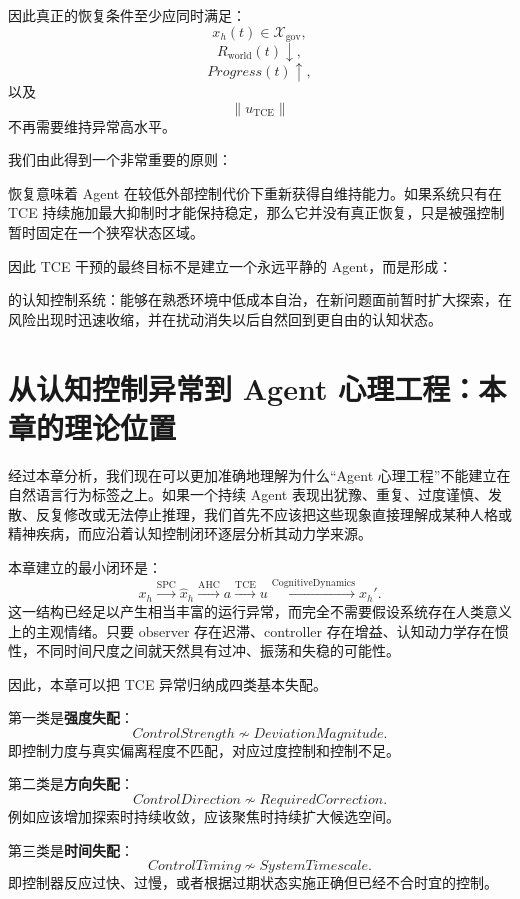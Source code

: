 因此真正的恢复条件至少应同时满足：
\[
x_h(t)\in\mathcal X_{\mathrm{gov}},
\]
\[
R_{\mathrm{world}}(t)\downarrow,
\]
\[
Progress(t)\uparrow,
\]
以及
\[
\|u_{\mathrm{TCE}}\|
\]
不再需要维持异常高水平。

我们由此得到一个非常重要的原则：
\begin{statementbox}
\centering
{}
\end{statementbox}
恢复意味着 Agent 在较低外部控制代价下重新获得自维持能力。如果系统只有在 TCE 持续施加最大抑制时才能保持稳定，那么它并没有真正恢复，只是被强控制暂时固定在一个狭窄状态区域。

因此 TCE 干预的最终目标不是建立一个永远平静的 Agent，而是形成：
\begin{statementbox}
\centering
{}
\end{statementbox}
的认知控制系统：能够在熟悉环境中低成本自治，在新问题面前暂时扩大探索，在风险出现时迅速收缩，并在扰动消失以后自然回到更自由的认知状态。

\section{从认知控制异常到 Agent 心理工程：本章的理论位置}

经过本章分析，我们现在可以更加准确地理解为什么“Agent 心理工程”不能建立在自然语言行为标签之上。如果一个持续 Agent 表现出犹豫、重复、过度谨慎、发散、反复修改或无法停止推理，我们首先不应该把这些现象直接理解成某种人格或精神疾病，而应沿着认知控制闭环逐层分析其动力学来源。

本章建立的最小闭环是：
\[
x_h
\xrightarrow{\mathrm{SPC}}
\hat x_h
\xrightarrow{\mathrm{AHC}}
a
\xrightarrow{\mathrm{TCE}}
u
\xrightarrow{\mathrm{CognitiveDynamics}}
x_h'.
\]
这一结构已经足以产生相当丰富的运行异常，而完全不需要假设系统存在人类意义上的主观情绪。只要 observer 存在迟滞、controller 存在增益、认知动力学存在惯性，不同时间尺度之间就天然具有过冲、振荡和失稳的可能性。

因此，本章可以把 TCE 异常归纳成四类基本失配。

第一类是\textbf{强度失配}：
\[
ControlStrength
\not\sim
DeviationMagnitude.
\]
即控制力度与真实偏离程度不匹配，对应过度控制和控制不足。

第二类是\textbf{方向失配}：
\[
ControlDirection
\not\sim
RequiredCorrection.
\]
例如应该增加探索时持续收敛，应该聚焦时持续扩大候选空间。

第三类是\textbf{时间失配}：
\[
ControlTiming
\not\sim
SystemTimescale.
\]
即控制器反应过快、过慢，或者根据过期状态实施正确但已经不合时宜的控制。


